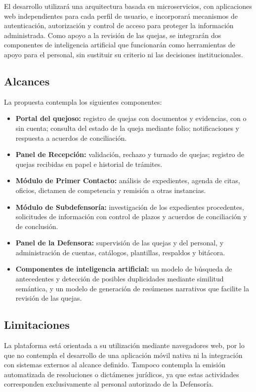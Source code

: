 El desarrollo utilizará una arquitectura basada en microservicios, con aplicaciones web independientes para cada perfil de usuario, e incorporará mecanismos de autenticación, autorización y control de acceso para proteger la información administrada. Como apoyo a la revisión de las quejas, se integrarán dos componentes de inteligencia artificial que funcionarán como herramientas de apoyo para el personal, sin sustituir su criterio ni las decisiones institucionales.

\subsection{Alcances}
La propuesta contempla los siguientes componentes:

\begin{itemize}
    \item \textbf{Portal del quejoso:} registro de quejas con documentos y evidencias, con o sin cuenta; consulta del estado de la queja mediante folio; notificaciones y respuesta a acuerdos de conciliación.
    \item \textbf{Panel de Recepción:} validación, rechazo y turnado de quejas; registro de quejas recibidas en papel e historial de trámites.
    \item \textbf{Módulo de Primer Contacto:} análisis de expedientes, agenda de citas, oficios, dictamen de competencia y remisión a otras instancias.
    \item \textbf{Módulo de Subdefensoría:} investigación de los expedientes procedentes, solicitudes de información con control de plazos y acuerdos de conciliación y de conclusión.
    \item \textbf{Panel de la Defensora:} supervisión de las quejas y del personal, y administración de cuentas, catálogos, plantillas, respaldos y bitácora.
    \item \textbf{Componentes de inteligencia artificial:} un modelo de búsqueda de antecedentes y detección de posibles duplicidades mediante similitud semántica, y un modelo de generación de resúmenes narrativos que facilite la revisión de las quejas.
\end{itemize}

\subsection{Limitaciones}
La plataforma está orientada a su utilización mediante navegadores web, por lo que no contempla el desarrollo de una aplicación móvil nativa ni la integración con sistemas externos al alcance definido. Tampoco contempla la emisión automatizada de resoluciones o dictámenes jurídicos, ya que estas actividades corresponden exclusivamente al personal autorizado de la Defensoría.

